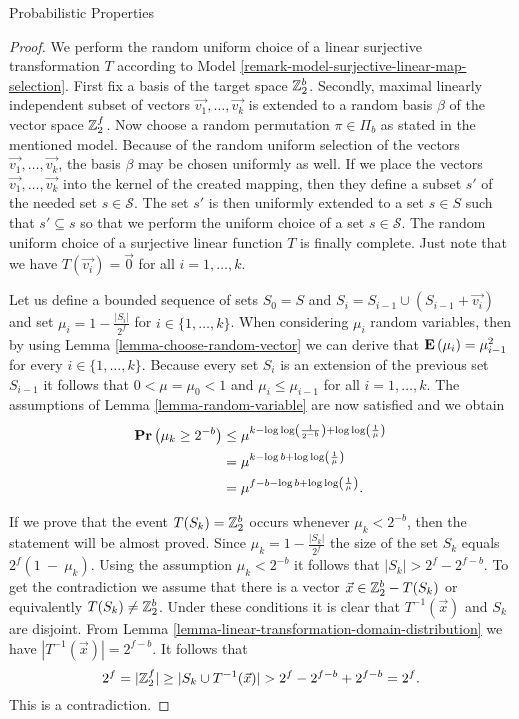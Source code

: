 \begin{section}{Probabilistic Properties}
\begin{proof}
We perform the random uniform choice of a linear surjective transformation $T$ according to Model \ref{remark-model-surjective-linear-map-selection}. First fix a basis of the target space $\mathbb{Z}_{2}^{b}$. Secondly, maximal linearly independent subset of vectors $\vec{v_1}, \dots, \vec{v_k}$ is extended to a random basis $\beta$ of the vector space $\mathbb{Z}_{2}^{f}$. Now choose a random permutation $\pi \in \Pi_b$ as stated in the mentioned model. Because of the random uniform selection of the vectors $\vec{v_1}, \dots, \vec{v_k}$, the basis $\beta$ may be chosen uniformly as well. If we place the vectors $\vec{v_1}, \dots, \vec{v_k}$ into the kernel of the created mapping, then they define a subset $s'$ of the needed set $s \in \mathcal{S}$. The set $s'$ is then uniformly extended to a set $s \in S$ such that $s' \subseteq s$ so that we perform the uniform choice of a set $s \in \mathcal{S}$. The random uniform choice of a surjective linear function $T$ is finally complete. Just note that we have $T(\vec{v_i}) = \vec{0}$ for all $i = 1, \dots, k$.	

Let us define a bounded sequence of sets $S_0 = S$ and $S_i = S_{i - 1} \cup (S_{i - 1} + \vec{v_i})$ and set $\mu_i = 1 - \frac{|S_i|}{2 ^ f}$ for $i \in \{ 1, \dots, k \}$. When considering $\mu_i$ random variables, then by using Lemma \ref{lemma-choose-random-vector}  we can derive that $\mathbf{E}\left(\mu_i\right) = \mu_{i - 1} ^ 2$ for every $i \in \{1, \dots, k \}$. Because every set $S_i$ is an extension of the previous set $S_{i - 1}$ it follows that $0 < \mu = \mu_0 < 1$ and $\mu_i \leq \mu_{i - 1}$ for all $i = 1, \dots, k$. The assumptions of Lemma \ref{lemma-random-variable} are now satisfied and we obtain
\[
\begin{split}
\mathbf{Pr}\left(\mu_k \geq 2 ^ {-b}\right) 
	& \leq \mu ^ {k - \log \log \left(\frac{1}{2 ^ {-b}}\right) + \log \log \left( \frac{1}{\mu} \right)} \\
	& = \mu ^ {k - \log b + \log \log \left(\frac{1}{\mu}\right)} \\
	& = \mu ^ {f - b - \log b + \log \log \left(\frac{1}{\mu}\right)} \text{.}
\end{split}
\]

If we prove that the event $T(S_k) = \mathbb{Z}_{2}^{b}$ occurs whenever $\mu_k < 2^{-b}$, then the statement will be almost proved. Since $\mu_k = 1 - \frac{|S_k|}{2 ^ f}$ the size of the set $S_k$ equals ${2 ^ f}(1~-~\mu_k)$. Using the assumption $\mu_k < 2 ^ {-b}$ it follows that $|S_k| > 2 ^ f - 2 ^ {f - b}$. To get the contradiction we assume that there is a vector $\vec{x} \in \mathbb{Z}_{2}^{b} - T(S_k)$ or equivalently $T(S_k) \neq \mathbb{Z}_{2}^{b}$. Under these conditions it is clear that $T ^ {-1}(\vec{x})$ and $S_k$ are disjoint. From Lemma \ref{lemma-linear-transformation-domain-distribution} we have $|T ^ {-1}(\vec{x})| = 2 ^ {f - b}$. It follows that
\[
2 ^ f = |\mathbb{Z}_{2}^{f}| \geq |S_k \cup T^{-1}(\vec{x})| > 2 ^ f - 2 ^ {f - b} + 2 ^ {f - b} = 2 ^ f \text{.}
\]
This is a contradiction. 


\end{proof}
\end{section}
